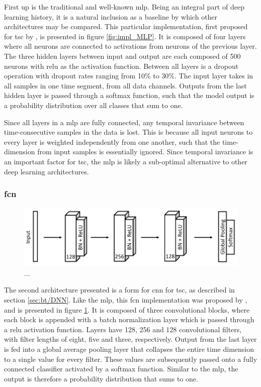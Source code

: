 First up is the traditional and well-known \acrfull{mlp}. Being an integral part of deep learning history, it is a natural inclusion as a baseline by which other architectures may be compared. This particular implementation, first proposed for \acrshort{tsc} by \textcite{wang2016}, is presented in figure \ref{fig:impl_MLP}. It is composed of four layers where all neurons are connected to activations from neurons of the previous layer. The three hidden layers between input and output are each composed of 500 neurons with \acrshort{relu} as the activation function. Between all layers is a dropout operation with dropout rates ranging from 10\% to 30\%. The input layer takes in all samples in one time segment, from all data channels. Outputs from the last hidden layer is passed through a softmax function, such that the model output is a probability distribution over all classes that sum to one.

Since all layers in a \acrshort{mlp} are fully connected, any temporal invariance between time-consecutive samples in the data is lost. This is because all input neurons to every layer is weighted independently from one another, such that the time-dimension from input samples is essentially ignored. Since temporal invariance is an important factor for \acrshort{tsc}, the \acrshort{mlp} is likely a sub-optimal alternative to other deep learning architectures. 

\newpage
\subsubsection{\acrlong{fcn}}

\begin{figure}[h]
    \centering
    \includegraphics[width=\textwidth]{figures/impl_FCN.png}
    \caption{...}
    \label{fig:impl_FCN}
\end{figure}

The second architecture presented is a form for \acrshort{cnn} for \acrshort{tsc}, as described in section \ref{sec:bt/DNN}. Like the \acrshort{mlp}, this \acrfull{fcn} implementation was proposed by \textcite{wang2016}, and is presented in figure \ref{fig:impl_FCN}. It is composed of three convolutional blocks, where each block is appended with a batch normalization layer which is passed through a \acrshort{relu} activation function. Layers have 128, 256 and 128 convolutional filters, with filter lengths of eight, five and three, respectively. Output from the last layer is fed into a global average pooling layer that collapses the entire time dimension to a single value for every filter. These values are subsequently passed onto a fully connected classifier activated by a softmax function. Similar to the \acrshort{mlp}, the output is therefore a probability distribution that sums to one.

